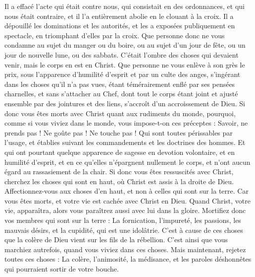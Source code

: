 \begin{multicols}{2}
Il a effacé l’acte qui était contre nous, qui consistait en des ordonnances, et qui nous était contraire, et il l'a entièrement abolie en le clouant à la croix.
Il a dépouillé les dominations et les autorités, et les a exposées publiquement en spectacle, en triomphant d’elles par la croix.
Que personne donc ne vous condamne au sujet du manger ou du boire, ou au sujet d'un jour de fête, ou un jour de nouvelle lune, ou des sabbats.
C’était l’ombre des choses qui devaient venir, mais le corps en est en Christ.
Que personne ne vous enlève à son grès le prix, sous l'apparence d'humilité d'esprit et par un culte des anges, s'ingérant dans les choses qu'il n'a pas vues, étant témérairement enflé par ses pensées charnelles,
et sans s’attacher au Chef, dont tout le corps étant joint et ajusté ensemble par des jointures et des liens, s’accroît d'un accroissement de Dieu.
Si donc vous êtes morts avec Christ quant aux rudiments du monde, pourquoi, comme si vous viviez dans le monde, vous impose-t-on ces préceptes :
Savoir, ne prends pas ! Ne goûte pas ! Ne touche pas !
Qui sont toutes périssables par l'usage, et établies suivant les commandements et les doctrines des hommes.
Et qui ont pourtant quelque apparence de sagesse en devotion volontaire, et en humilité d'esprit, et en ce qu'elles n'épargnent nullement le corps, et n'ont aucun égard au rassasiement de la chair.
\VerseOne{}Si donc vous êtes ressuscités avec Christ, cherchez les choses qui sont en haut, où Christ est assis à la droite de Dieu.
Affectionnez-vous aux choses d’en haut, et non à celles qui sont sur la terre.
Car vous êtes morts, et votre vie est cachée avec Christ en Dieu.
Quand Christ, votre vie, apparaîtra, alors vous paraîtrez aussi avec lui dans la gloire.
Mortifiez donc vos membres qui sont sur la terre : La fornication, l’impureté, les passions, les mauvais désirs, et la cupidité, qui est une idolâtrie.
C’est à cause de ces choses que la colère de Dieu vient sur les fils de la rébellion.
C’est ainsi que vous marchiez autrefois, quand vous viviez dans ces choses.
Mais maintenant, rejetez toutes ces choses : La colère, l'animosité, la médisance, et les paroles déshonnêtes qui pourraient sortir de votre bouche.

\end{multicols}

